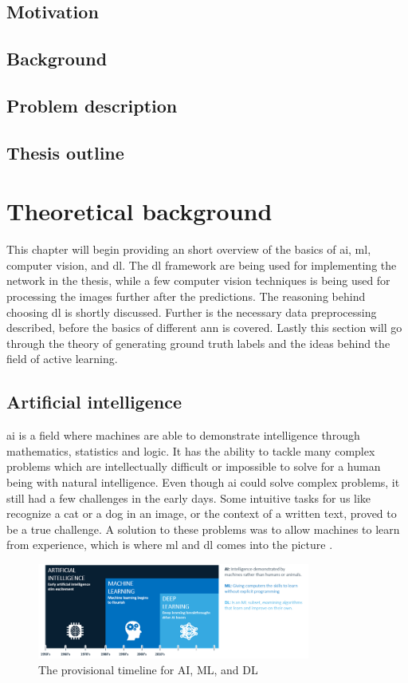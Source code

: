 \documentclass[USenglish]{ifimaster}  %
\begin{document}
\section{Motivation}
\section{Background}
\section{Problem description}
\section{Thesis outline}

\chapter{Theoretical background}
This chapter will begin providing an short overview of the basics of \ac{ai}, \ac{ml}, computer vision, and \acf{dl}. The \ac{dl} framework are being used for implementing the network in the thesis, while a few computer vision techniques is being used for processing the images further after the predictions. The reasoning behind choosing \ac{dl} is shortly discussed. Further is the necessary data preprocessing described, before the basics of different \ac{ann} is covered. Lastly this section will go through the theory of generating ground truth labels and the ideas behind the field of active learning. 

\section{Artificial intelligence}
\ac{ai} is a field where machines are able to demonstrate intelligence through mathematics, statistics and logic. It has the ability to tackle many complex problems which are intellectually difficult or impossible to solve for a human being with natural intelligence. Even though \ac{ai} could solve complex problems, it still had a few challenges in the early days. Some intuitive tasks for us like recognize a cat or a dog in an image, or the context of a written text, proved to be a true challenge. A solution to these problems was to allow machines to learn from experience, which is where \ac{ml} and \ac{dl} comes into the picture \cite{The_holy_grail_of_DL}.

\begin{figure}[ht]
    \centering
    \includegraphics[width=0.8\textwidth]{bilder/AI_ML_DL.png}
    \caption{The provisional timeline for AI, ML, and DL \cite{website:AI}}
    \label{fig:AI}
\end{figure}
\end{document}
